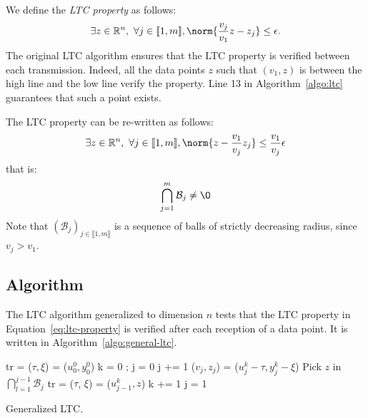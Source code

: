 \documentclass{report}
\begin{document}
We define the \emph{LTC property} as follows:
\begin{equation*}
\exists z \in \mathbb{R}^n, \ \forall j \in \llbracket 1, m \rrbracket, \norm{\frac{v_j}{v_1}z-z_j} \leq \epsilon.
\end{equation*}
The original LTC algorithm ensures that the LTC property is
verified between each transmission. Indeed, all the data points
$z$ such that $(v_1, z)$ is between the high line and the low line
verify the property. Line 13 in Algorithm~\ref{algo:ltc} guarantees that
such a point exists.

The LTC property can be re-written as follows:
\begin{equation*}
\exists z \in \mathbb{R}^n, \ \forall j \in \llbracket 1, m \rrbracket, \norm{z-\frac{v_1}{v_j}z_j} \leq \frac{v_1}{v_j}\epsilon
\end{equation*}
that is:
\begin{equation}
\bigcap_{j=1}^m \mathcal{B}_j \neq \O
\label{eq:ltc-property}
\end{equation}
Note that $(\mathcal{B}_j)_{j \in \llbracket 1, m \rrbracket}$ is a sequence
of balls of strictly decreasing radius, since $v_j > v_1$.

\subsection{Algorithm}

The LTC algorithm generalized to dimension $n$ tests that the LTC 
property in Equation~\ref{eq:ltc-property} is verified after each reception of a data 
point. It is written in Algorithm~\ref{algo:general-ltc}.
\begin{algorithm}
\begin{algorithmic}[1]
\Input
\EndInput
\Output
\EndOutput

\State tr = ($\tau, \xi$) = ($u^0_0, y^0_0$) 
\State k = 0 ; j = 0
    \State j += 1
    \State ($v_j, z_j$) = ($u_j^k - \tau, y_j^k - \xi$)
        \State Pick $z$ in $\bigcap_{l=1}^{j-1}{\mathcal{B}_j}$ 
        \State tr = ($\tau$, $\xi$) = ($u^k_{j-1}, z$)
        \State k += 1
        \State j = 1
    \EndIf
\EndWhile
\end{algorithmic}
\caption{Generalized LTC.}
\label{algo:general-ltc}
\end{algorithm}
\end{document}
